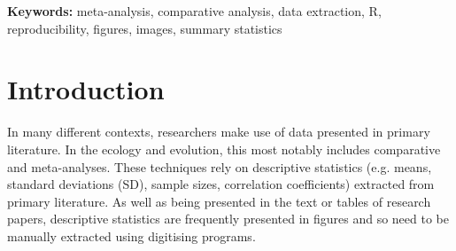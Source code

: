 \documentclass[12pt]{article}
\let\proglang=\textsf
\begin{document}
\vskip10pt
 \textbf{Keywords:} meta-analysis, comparative analysis, data extraction, \proglang{R}, reproducibility, figures, images, summary statistics




\clearpage



\section{Introduction}



In many different contexts, researchers make use of data presented in primary literature. In the ecology and evolution, this most notably includes comparative and meta-analyses. These techniques rely on descriptive statistics (e.g. means, standard deviations (SD), sample sizes, correlation coefficients) extracted from primary literature. As well as being presented in the text or tables of research papers, descriptive statistics are frequently presented in figures and so need to be manually extracted using digitising programs. 
\end{document}
